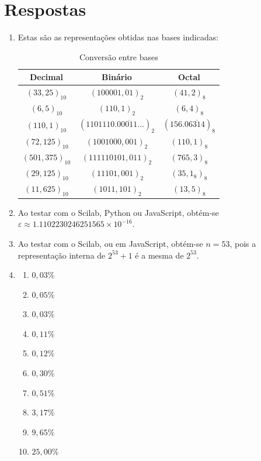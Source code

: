 \documentclass[12pt,a4paper]{article}
\begin{document}
\newpage
\section*{Respostas}
\begin{enumerate}
\item Estas são as representações obtidas nas bases indicadas:
\begin{table}[h]
\centering
\caption{Conversão entre bases}
\begin{tabular}{|c|c|c|}
\hline
  \textbf{Decimal}
& \textbf{Binário}
& \textbf{Octal} \\ \hline
  $(33,25)_{10}$
& $(100001,01)_2$
& $(41,2)_8$ \\ \hline
  $(6,5)_{10}$
& $(110,1)_2$
& $(6,4)_8$ \\ \hline
  $(110,1)_{10}$
& $(1101110.0\overline{0011}...)_2$
& $(156.0\overline{6314})_8$ \\ \hline
  $(72,125)_{10}$
& $(1001000,001)_2$
& $(110,1)_8$ \\ \hline
  $(501,375)_{10}$
& $(111110101,011)_2$
& $(765,3)_8$ \\ \hline
  $(29,125)_{10}$
& $(11101,001)_2$
& $(35,1_8)_8$ \\ \hline
  $(11,625)_{10}$
& $(1011,101)_2$
& $(13,5)_8$ \\ \hline
\end{tabular}
\end{table}

\item Ao testar com o Scilab, Python ou JavaScript, obtém-se $\varepsilon \approx 1.1102230246251565 \times 10 ^{-16}$.

\item Ao testar com o Scilab, ou em JavaScript, obtém-se $n=53$, pois a representação interna de $2^{53} +1$ é a mesma de $2^{53}$.

\item
\begin{multicols}{5}
\begin{enumerate}
\item $0,03\%$
\item $0,05\%$
\item $0,03\%$
\item $0,11\%$
\item $0,12\%$
\item $0,30\%$
\item $0,51\%$
\item $3,17\%$
\item $9,65\%$
\item $25,00\%$
\end{enumerate}
\end{multicols}


\end{enumerate}
\end{document}
